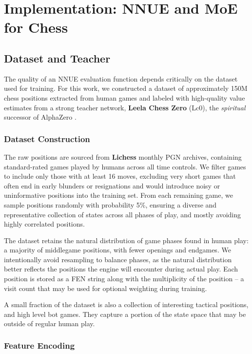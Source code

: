 \chapter{Implementation: NNUE and MoE for Chess}

\section{Dataset and Teacher}

The quality of an NNUE evaluation function depends critically on the dataset used for training. For this work, we constructed a dataset of approximately 150M chess positions extracted from human games and labeled with high-quality value estimates from a strong teacher network, \textbf{Leela Chess Zero} (Lc0), the \emph{spiritual} successor of AlphaZero \parencite{lczero}.

\subsection{Dataset Construction}

The raw positions are sourced from \textbf{Lichess} monthly PGN archives, containing standard-rated games played by humans across all time controls. We filter games to include only those with at least 16 moves, excluding very short games that often end in early blunders or resignations and would introduce noisy or uninformative positions into the training set. From each remaining game, we sample positions randomly with probability 5\%, ensuring a diverse and representative collection of states across all phases of play, and mostly avoiding highly correlated positions.

The dataset retains the natural distribution of game phases found in human play: a majority of middlegame positions, with fewer openings and endgames. We intentionally avoid resampling to balance phases, as the natural distribution better reflects the positions the engine will encounter during actual play. Each position is stored as a FEN string along with the multiplicity of the position -- a visit count that may be used for optional weighting during training.

A small fraction of the dataset is also a collection of interesting tactical positions, and high level bot games. They capture a portion of the state space that may be outside of regular human play.

\subsection{Feature Encoding}

